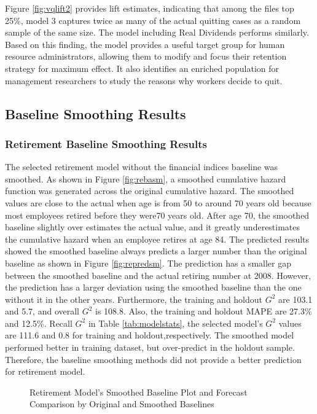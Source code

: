 Figure \ref{fig:vqlift2} provides lift estimates, indicating that among the files top 25\%, model 3 captures twice as many of the actual quitting cases as a random sample of the same size.  The model including Real Dividends performs similarly. Based on this finding, the model provides a useful target group for human resource administrators, allowing them to modify and focus their retention strategy for maximum effect. It also identifies an enriched population for management researchers to study the reasons why workers decide to quit.
\subsection{Baseline Smoothing Results}
\subsubsection{Retirement Baseline Smoothing Results}
The selected retirement model without the financial indices baseline was smoothed. As shown in Figure \ref{fig:rebasm}, a smoothed cumulative hazard function was generated across the original cumulative hazard. The smoothed values are close to the actual when age is from 50 to around 70 years old because most employees retired before they were70 years old. After age 70, the smoothed baseline slightly over estimates the actual value, and it greatly underestimates the cumulative hazard when an employee retires at age 84. The predicted results showed the smoothed baseline always predicts a larger number than the original baseline as shown in Figure \ref{fig:repredsm}. The prediction has a smaller gap between the smoothed baseline and the actual retiring number at 2008. However, the prediction has a larger deviation using the smoothed baseline than the one without it in the other years. Furthermore, the training and holdout $G^2$ are 103.1 and 5.7, and overall $G^2$ is 108.8. Also, the training and holdout MAPE are 27.3\% and 12.5\%. Recall $G^2$ in Table \ref{tab:modelstats}, the selected model's $G^2$ values are 111.6 and 0.8 for training and holdout,respectively. The smoothed model performed better in training dataset, but over-predict in the holdout sample. Therefore, the baseline smoothing methods did not provide a better prediction for retirement model.

\begin{figure}[h!]
	\centering
	\caption{Retirement Model's Smoothed Baseline Plot and Forecast Comparison by Original and Smoothed Baselines}
	\label{fig:rebaselinesm}
\end{figure}
